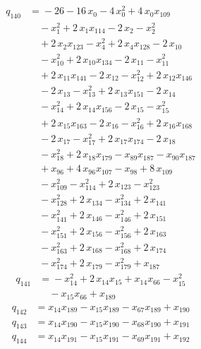 \begin{align*}
q_{140} &={}-26 -16\,x_{0} -4\,x_{0}^{2} +4\,x_{0}x_{109}\\
&\quad -x_{1}^{2} +2\,x_{1}x_{114} -2\,x_{2} -x_{2}^{2}\\
&\quad +2\,x_{2}x_{123} -x_{4}^{2} +2\,x_{4}x_{128} -2\,x_{10}\\
&\quad -x_{10}^{2} +2\,x_{10}x_{134} -2\,x_{11} -x_{11}^{2}\\
&\quad +2\,x_{11}x_{141} -2\,x_{12} -x_{12}^{2} +2\,x_{12}x_{146}\\
&\quad -2\,x_{13} -x_{13}^{2} +2\,x_{13}x_{151} -2\,x_{14}\\
&\quad -x_{14}^{2} +2\,x_{14}x_{156} -2\,x_{15} -x_{15}^{2}\\
&\quad +2\,x_{15}x_{163} -2\,x_{16} -x_{16}^{2} +2\,x_{16}x_{168}\\
&\quad -2\,x_{17} -x_{17}^{2} +2\,x_{17}x_{174} -2\,x_{18}\\
&\quad -x_{18}^{2} +2\,x_{18}x_{179} -x_{89}x_{187} -x_{90}x_{187}\\
&\quad +x_{96} +4\,x_{96}x_{107} -x_{98} +8\,x_{109}\\
&\quad -x_{109}^{2} -x_{114}^{2} +2\,x_{123} -x_{123}^{2}\\
&\quad -x_{128}^{2} +2\,x_{134} -x_{134}^{2} +2\,x_{141}\\
&\quad -x_{141}^{2} +2\,x_{146} -x_{146}^{2} +2\,x_{151}\\
&\quad -x_{151}^{2} +2\,x_{156} -x_{156}^{2} +2\,x_{163}\\
&\quad -x_{163}^{2} +2\,x_{168} -x_{168}^{2} +2\,x_{174}\\
&\quad -x_{174}^{2} +2\,x_{179} -x_{179}^{2} +x_{187}
\end{align*}
\begin{align*}
q_{141} &={}-x_{14}^{2} +2\,x_{14}x_{15} +x_{14}x_{66} -x_{15}^{2}\\
&\quad -x_{15}x_{66} +x_{189}
\end{align*}
\begin{align*}
q_{142} &={}x_{14}x_{189} -x_{15}x_{189} -x_{67}x_{189} +x_{190}
\end{align*}
\begin{align*}
q_{143} &={}x_{14}x_{190} -x_{15}x_{190} -x_{68}x_{190} +x_{191}
\end{align*}
\begin{align*}
q_{144} &={}x_{14}x_{191} -x_{15}x_{191} -x_{69}x_{191} +x_{192}
\end{align*}
